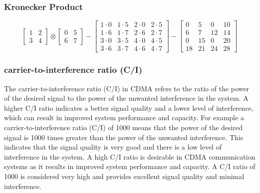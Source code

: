 \subsubsection{Kronecker Product}
\begin{equation}\label{eq:kronecker_example}
\left[\begin{array}{ll}
1 & 2 \\
3 & 4
\end{array}\right] \otimes\left[\begin{array}{ll}
0 & 5 \\
6 & 7
\end{array}\right]-\left[\begin{array}{llll}
1 \cdot 0 & 1 \cdot 5 & 2 \cdot 0 & 2 \cdot 5 \\
1 \cdot 6 & 1 \cdot 7 & 2 \cdot 6 & 2 \cdot 7 \\
3 \cdot 0 & 3 \cdot 5 & 4 \cdot 0 & 4 \cdot 5 \\
3 \cdot 6 & 3 \cdot 7 & 4 \cdot 6 & 4 \cdot 7
\end{array}\right]-\left[\begin{array}{cccc}
0 & 5 & 0 & 10 \\
6 & 7 & 12 & 14 \\
0 & 15 & 0 & 20 \\
18 & 21 & 24 & 28
\end{array}\right]
\end{equation}
\subsubsection{carrier-to-interference ratio (C/I)}
The carrier-to-interference ratio (C/I) in CDMA refers to the ratio of the power of the desired signal to the power of the unwanted interference in the system. A higher C/I ratio indicates a better signal quality and a lower level of interference, which can result in improved system performance and capacity. For example a carrier-to-interference ratio (C/I) of 1000 means that the power of the desired signal is 1000 times greater than the power of the unwanted interference. This indicates that the signal quality is very good and there is a low level of interference in the system. A high C/I ratio is desirable in CDMA communication systems as it results in improved system performance and capacity. A C/I ratio of 1000 is considered very high and provides excellent signal quality and minimal interference.
